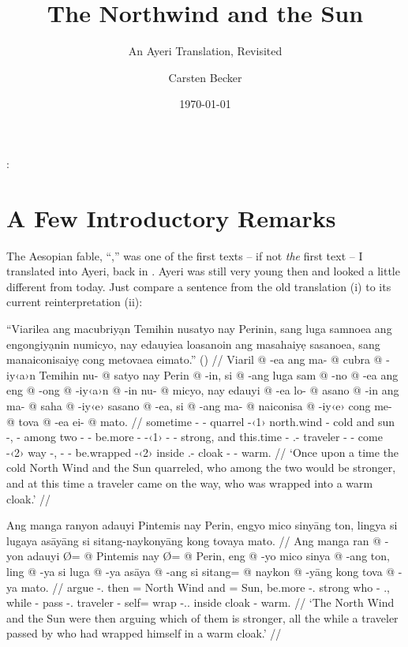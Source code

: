 \documentclass[12pt,paper=a4]{scrartcl}
\author{Carsten Becker}
\title{The Northwind and the Sun}
\subtitle{An Ayeri Translation, Revisited}
\date{\today} %
\newenvironment{mytitle}{
    \hfill
    \begin{minipage}{0.667\textwidth}
	\vspace{\baselineskip}
	\begin{center}
	    \Large
	    \sffamily\bfseries
	    \makeatletter
}{
	    \makeatother
	\end{center}
	\vspace{1em}
    \end{minipage}
    \hfill
}
\begin{document}

\begin{mytitle}
    \@title:\\
    \@subtitle
\end{mytitle}

\section{A Few Introductory Remarks}

The Aesopian fable, \enquote{,} was one of the first texts -- if not \emph{the} first text -- I translated into Ayeri, back in \citeyear{becker2004}. Ayeri was still very young then and looked a little different from today. Just compare a sentence from the old translation (i) to its current reinterpretation (ii):

\ex[exno=i, belowexskip=0em]
\begingl
	\glpreamble \enquote{Viarilea ang macubriyạn Temihin nusatyo nay Perinin, sang luga samnoea ang engongiyạnin numicyo, nay edauyiea loasanoin ang masahaiyẹ sasanoea, sang manaiconisaiyẹ cong metovaea eimato.} (\cite[1]{becker2004}) //
	\gla Viaril @ -ea ang ma- @ cubra @ -iy‹a›n Temihin nu- @ satyo nay Perin @ -in, si @ -ang luga sam @ -no @ -ea ang eng @ -ong @ -iy‹a›n @ -in nu- @ micyo, nay edauyi @ -ea lo- @ asano @ -in ang ma- @ saha @ -iy‹e› sasano @ -ea, si @ -ang ma- @ naiconisa @ -iy‹e› cong me- @ tova @ -ea ei- @ mato. //
	\glb sometime -\Loc{} \AgtT{} \Pst{}- quarrel -\Tpl{}‹1› north.wind \Aarg{}- cold and sun -\Top{}, \Rel{} -\Aarg{} among two -\Nmlz{} -\Loc{} \AgtT{} be.more -\Irr{} -\Tpl{}‹1› -\Top{} \Aarg{}- strong, and this.time -\Loc{} \Indf{}.\Aarg{}- traveler -\Top{} \AgtT{} \Pst{}- come -\Tsg{}‹2› way -\Loc{}, \Rel{} -\Aarg{} \Pst{}- be.wrapped -\Tsg{}‹2› inside \Indf{}.\Parg{}- cloak -\Loc{} \Obl{}- warm. //
	\glft `Once upon a time the cold North Wind and the Sun quarreled, who among the two would be stronger, and at this time a traveler came on the way, who was wrapped into a warm cloak.' //
\endgl\xe

\ex[exno=ii]
\begingl
	\glpreamble Ang manga ranyon adauyi Pintemis nay Perin, engyo mico sinyāng ton, lingya si lugaya asāyāng si sitang-naykonyāng kong tovaya mato. //
	\gla Ang manga ran @ -yon adauyi Ø= @ Pintemis nay Ø= @ Perin, eng @ -yo mico sinya @ -ang ton, ling @ -ya si luga @ -ya asāya @ -ang si sitang= @ naykon @ -yāng kong tova @ -ya mato. //
	\glb \AgtT{} \Prog{} argue -\Tpl{}.\N{} then \Top{}= {North Wind} and \Top{}= Sun, be.more -\Tsg{}.\N{} strong who -\Aarg{} \Tpl{}.\Gen{}, while -\Loc{} \Rel{} pass -\Tsg{}.\M{} traveler -\Aarg{} \Rel{} self= wrap -\Tsg{}.\M{}.\Aarg{} inside cloak -\Loc{} warm. //
	\glft `The North Wind and the Sun were then arguing which of them is stronger, all the while a traveler passed by who had wrapped himself in a warm cloak.' //
\endgl
\xe
\end{document}
